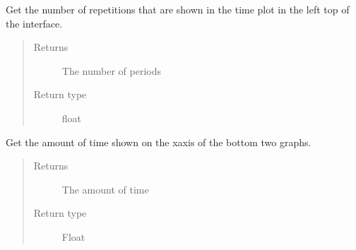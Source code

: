 \documentclass[letterpaper,10pt,english]{sphinxmanual}
\begin{document}
\begin{fulllineitems}
\begin{fulllineitems}
\end{fulllineitems}


\begin{fulllineitems}
\label{\detokenize{index:TiePieLCR_settings.TiePieLCR_settings.get_plot_periods}}
\sphinxAtStartPar
Get the number of repetitions that are shown in the time plot in the left top of the interface.
\begin{quote}\begin{description}
\item[{Returns}] \leavevmode
\sphinxAtStartPar
The number of periods

\item[{Return type}] \leavevmode
\sphinxAtStartPar
float

\end{description}\end{quote}

\end{fulllineitems}


\begin{fulllineitems}
\label{\detokenize{index:TiePieLCR_settings.TiePieLCR_settings.get_plot_time}}
\sphinxAtStartPar
Get the amount of time shown on the x\sphinxhyphen{}axis of the bottom two graphs.
\begin{quote}\begin{description}
\item[{Returns}] \leavevmode
\sphinxAtStartPar
The amount of time

\item[{Return type}] \leavevmode
\sphinxAtStartPar
Float

\end{description}\end{quote}

\end{fulllineitems}



\end{fulllineitems}
\end{document}
